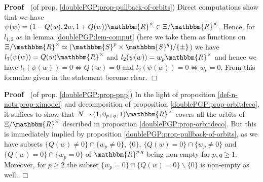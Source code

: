 \documentclass{article}
\newenvironment{proof}{\noindent\textbf{Proof\ }}{\hspace*{\fill}$\Box$\medskip}
\numberwithin{definition}{section}
\numberwithin{lemma}{section}
\numberwithin{proposition}{section}
{\theorembodyfont{\rmfamily}\newtheorem{remark}{Remark}
\numberwithin{remark}{section}
}
\begin{document}
\begin{proof}
  (of prop. \ref{doublePGP:prop-pullback-of-orbits}) Direct computations show
  that we have $\psi ( w) = ( 1 - Q ( w), 2 w, 1 + Q ( w))
  \mathbbm{R}^{\times} \in \Xi /\mathbbm{R}^{\times}$. Hence, for $l_{1, 2}$
  as in lemma \ref{doublePGP:lem-comput} (here we take them as functions on
  $\Xi /\mathbbm{R}^{\times} \simeq ( \mathbbm{S}^p \times \mathbbm{S}^q) / \{
  \pm \}$) we have $l_1 ( \psi ( w)) = Q ( w) \mathbbm{R}^{\times}$ and $l_2 (
  \psi ( w)) = w_p \mathbbm{R}^{\times}$ and hence we have $l_1 ( \psi ( w)) =
  0 \Leftrightarrow Q ( w) = 0$ and $l_2 ( \psi ( w)) = 0 \Leftrightarrow w_p
  = 0$. From this formulae given in the statement become clear.
\end{proof}

\begin{proof}
  (of prop. \ref{doublePGP:prop-pnp}) In the light of proposition
  \ref{def-n-nots:prop-ximodel} and decomposition of proposition
  \ref{doublePGP:prop-orbitdeco}, it suffices to show that $N_- \cdot ( 1,
  0_{p + q}, 1) \mathbbm{R}^{\times}$ covers all the orbits of $\Xi
  /\mathbbm{R}^{\times}$ described in proposition
  \ref{doublePGP:prop-orbitdeco}. But this is immediately implied by
  proposition \ref{doublePGP:prop-pullback-of-orbits}, as we have subsets $\{
  Q ( w) \neq 0 \} \cap \{ w_p \neq 0 \}$, $\{ 0 \}$, $\{ Q ( w) = 0 \} \cap
  \{ w_p \neq 0 \}$ and $\{ Q ( w) = 0 \} \cap \{ w_p = 0 \}$ of
  $\mathbbm{R}^{p, q}$ being non-empty for $p, q \geqslant 1$. Moreover, for
  $p \geqslant 2$ the subset $\{ w_p = 0 \} \cap \{ Q ( w) = 0 \} \backslash
  \{ 0 \}$ is non-empty as well.
\end{proof}
\end{document}
